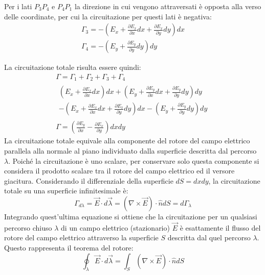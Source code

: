 \documentclass{article}
\numberwithin{equation}{subsection}
\begin{document}
Per i lati $P_3P_4$ e $P_4P_1$ la direzione in cui vengono attraversati è opposta alla verso delle coordinate, per cui la circuitazione per questi lati è negativa:
\begin{gather*}
    \Gamma_3=-\left(E_x+\displaystyle\frac{\partial E_x}{\partial x}dx+\frac{\partial E_x}{\partial y}dy\right)dx\\
    \Gamma_4=-\left(E_y+\displaystyle\frac{\partial E_y}{\partial y}dy\right)dy
\end{gather*} 

La circuitazione totale risulta essere quindi:
\begin{gather*}
    \Gamma=\Gamma_1+\Gamma_2+\Gamma_3+\Gamma_4\\
    \begin{matrix}
        \displaystyle\left(E_x+\frac{\partial E_x}{\partial x}dx\right)dx+\left(E_y+\frac{\partial E_y}{\partial x}dx+\frac{\partial E_y}{\partial y}dy\right)dy\\
        \displaystyle-\left(E_x+\frac{\partial E_x}{\partial x}dx+\frac{\partial E_x}{\partial y}dy\right)dx-\left(E_y+\frac{\partial E_y}{\partial y}dy\right)dy
    \end{matrix}\\
    \Gamma=\left(\displaystyle\frac{\partial E_y}{\partial x}-\frac{\partial E_x}{\partial y}\right)dxdy
\end{gather*}
La circuitazione totale equivale alla componente del rotore del campo elettrico parallela alla normale al piano individuato dalla superficie descritta dal percorso $\lambda$. 
Poiché la circuitazione è uno scalare, per conservare solo questa componente si considera il prodotto scalare tra il rotore del campo elettrico ed il versore giacitura. 
Considerando il differenziale della superficie $dS=dxdy$, la circuitazione totale su una superficie infinitesimale è:
\begin{equation*}
    \Gamma_{d\lambda}=\vec{E}\cdot d\vec{\lambda}=({\nabla}\times\vec{E})\cdot \hat{n}dS=d\Gamma_\lambda
\end{equation*}
Integrando quest'ultima equazione si ottiene che la circuitazione per un qualsiasi percorso chiuso $\lambda$ di un campo elettrico (stazionario) $\vec{E}$ è esattamente il 
flusso del rotore del campo elettrico attraverso la superficie $S$ descritta dal quel percorso $\lambda$. Questo rappresenta il teorema del rotore: 
\begin{equation}
    \displaystyle\oint_{\lambda}\vec{E}\cdot d\vec{\lambda}=\int_S({\nabla}\times\vec{E})\cdot\hat{n}dS
\end{equation}
\end{document}
